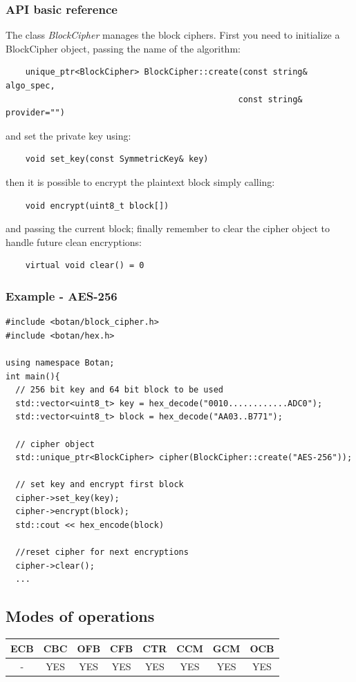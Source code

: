 \subsubsection*{API basic reference}
The class \textit{BlockCipher} manages the block ciphers. First you need to initialize a BlockCipher object, passing the name of the algorithm:
\begin{verbatim}
    unique_ptr<BlockCipher> BlockCipher::create(const string& algo_spec,
                                               const string& provider="")
\end{verbatim}
and set the private key using:
\begin{verbatim}
    void set_key(const SymmetricKey& key)
\end{verbatim}
then it is possible to encrypt the plaintext block simply calling:
\begin{verbatim}
    void encrypt(uint8_t block[])
\end{verbatim}
and passing the current block; finally remember to clear the cipher object to handle future clean encryptions:
\begin{verbatim}
    virtual void clear() = 0
\end{verbatim}

\subsubsection*{Example - AES-256}
\begin{verbatim}
#include <botan/block_cipher.h>
#include <botan/hex.h>

using namespace Botan;
int main(){
  // 256 bit key and 64 bit block to be used
  std::vector<uint8_t> key = hex_decode("0010............ADC0");
  std::vector<uint8_t> block = hex_decode("AA03..B771");

  // cipher object
  std::unique_ptr<BlockCipher> cipher(BlockCipher::create("AES-256"));

  // set key and encrypt first block
  cipher->set_key(key);
  cipher->encrypt(block);
  std::cout << hex_encode(block)

  //reset cipher for next encryptions
  cipher->clear();
  ...
\end{verbatim}

\newpage
\subsection{Modes of operations}
\begin{table}[!h]
	\begin{tabular}{|| c | c | c | c | c | c | c | c ||}
		\textbf{ECB} & \textbf{CBC} & \textbf{OFB} & \textbf{CFB} & \textbf{CTR} & \textbf{CCM} & \textbf{GCM} & \textbf{OCB} \\
		\hline \hline
		- & YES & YES & YES & YES  & YES & YES & YES\\
	\end{tabular}
\end{table}

